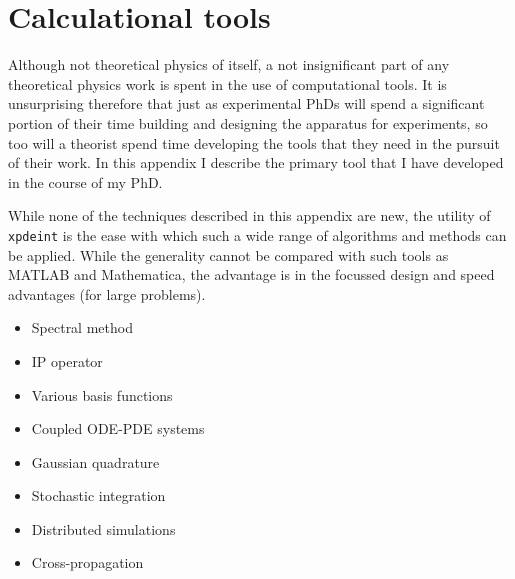 \chapter{Calculational tools}
\label{ToolsAppendix}
\graphicspath{{Figures/ToolsAppendix/}{Figures/Common/}}


Although not theoretical physics of itself, a not insignificant part of any theoretical physics work is spent in the use of computational tools. It is unsurprising therefore that just as experimental PhDs will spend a significant portion of their time building and designing the apparatus for experiments, so too will a theorist spend time developing the tools that they need in the pursuit of their work. In this appendix I describe the primary tool that I have developed in the course of my PhD. %

While none of the techniques described in this appendix are new, the utility of \texttt{xpdeint} is the ease with which such a wide range of algorithms and methods can be applied. While the generality cannot be compared with such tools as MATLAB and Mathematica, the advantage is in the focussed design and speed advantages (for large problems).

\begin{itemize}
    \item Spectral method
    \item IP operator
    \item Various basis functions
    \item Coupled ODE-PDE systems
    \item Gaussian quadrature
    \item Stochastic integration
    \item Distributed simulations
    \item Cross-propagation
\end{itemize}